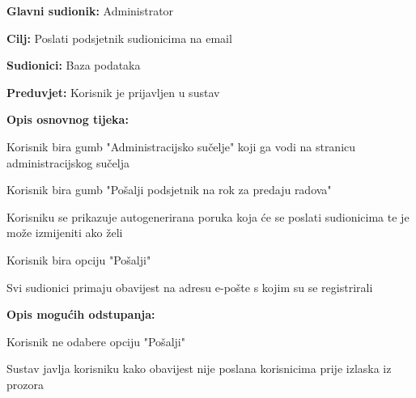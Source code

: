				\noindent {}
					
					\begin{packed_item}
						
						\item \textbf{Glavni sudionik: } Administrator
						\item  \textbf{Cilj:} Poslati podsjetnik sudionicima na email
						\item  \textbf{Sudionici:} Baza podataka
						\item  \textbf{Preduvjet:} Korisnik je prijavljen u sustav
						\item  \textbf{Opis osnovnog tijeka:}
						
						\item[] \begin{packed_enum}
							\item Korisnik bira gumb "Administracijsko sučelje" koji ga vodi na stranicu administracijskog sučelja
							\item Korisnik bira gumb "Pošalji podsjetnik na rok za predaju radova"
							\item Korisniku se prikazuje autogenerirana poruka koja će se poslati sudionicima te je može izmijeniti ako želi
							\item Korisnik bira opciju "Pošalji"
							\item Svi sudionici primaju obavijest na adresu e-pošte s kojim su se registrirali
							
							
							
						\end{packed_enum}
						
						\item \textbf{Opis mogućih odstupanja:}
							\item[] \begin{packed_enum}
								\item[3.a] Korisnik ne odabere opciju "Pošalji"
								\item[] \begin{packed_enum}
									\item[1.] Sustav javlja korisniku kako obavijest nije poslana korisnicima prije izlaska iz prozora
							\end{packed_enum}
						\end{packed_enum}
						
						
					\end{packed_item}
				\noindent {}
